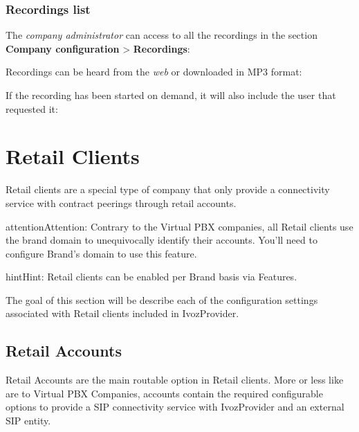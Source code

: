 \documentclass[letterpaper,10pt,english]{sphinxmanual}
\begin{document}
\subsection{Recordings list}
\label{pbx_features/call_recording:recordings-list}
The \emph{company administrator} can access to all the recordings in the section
\textbf{Company configuration} \textgreater{} \textbf{Recordings}:

\noindent{}

Recordings can be heard from the \emph{web} or downloaded in MP3 format:

\noindent{}

If the recording has been started on demand, it will also include the user
that requested it:

\noindent{}


\chapter{Retail Clients}
\label{retail/index:retail-clients}\label{retail/index::doc}
Retail clients are a special type of company that only provide a connectivity
service with contract peerings through retail accounts.

\begin{notice}{attention}{Attention:}
Contrary to the Virtual PBX companies, all Retail clients use the
brand domain to unequivocally identify their accounts. You'll need to configure
Brand's domain to use this feature.
\end{notice}

\begin{notice}{hint}{Hint:}
Retail clients can be enabled per Brand basis via Features.
\end{notice}

The goal of this section will be describe each of the configuration settings
associated with Retail clients included in IvozProvider.


\section{Retail Accounts}
\label{retail/retail_accounts::doc}\label{retail/retail_accounts:retail-accounts}\label{retail/retail_accounts:id1}
Retail Accounts are the main routable option in Retail clients.
More or less like {\hyperref[pbx_features/friends:friends]{}} are to Virtual PBX Companies, accounts
contain the required configurable options to provide a SIP connectivity
service with IvozProvider and an external SIP entity.
\end{document}
